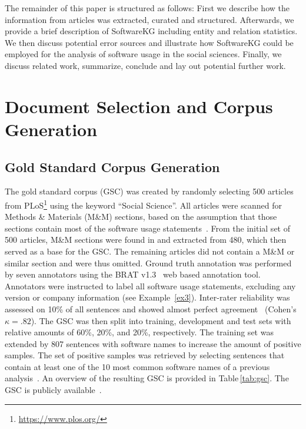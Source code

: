 \documentclass[runningheads]{llncs}
\newcommand{\tabref}[1]{Table\,\ref{#1}}
\begin{document}
The remainder of this paper is structured as follows: 
First we describe how the information from articles was extracted, curated and structured. 
Afterwards, we provide a brief description of SoftwareKG including entity and relation statistics. 
We then discuss potential error sources and illustrate how SoftwareKG could be employed for the analysis of software usage in the social sciences.
Finally, we discuss related work, summarize, conclude and lay out potential further work.  

\section{Document Selection and Corpus Generation}

\subsection{Gold Standard Corpus Generation}\label{sec:gsc}
The gold standard corpus (GSC) was created by randomly selecting 500 articles from PLoS\footnote{\url{https://www.plos.org/}} using the keyword ``Social Science''.
All articles were scanned for Methods \& Materials (M\&M) sections, based on the assumption that those sections contain most of the software usage statements~\cite{duck2013bionerds}.
From the initial set of 500 articles, M\&M sections were found in and extracted from 480, which then served as a base for the GSC.
The remaining articles did not contain a M\&M or similar section and were thus omitted.
Ground truth annotation was performed by seven annotators using the BRAT v1.3~\cite{stenetorp2012brat} web based annotation tool.
Annotators were instructed to label all software usage statements, excluding any version or company information (see Example~\ref{ex3}).
Inter-rater reliability was assessed on 10\% of all sentences and showed almost perfect agreement~\cite{landis1977measurement} (Cohen's $\kappa{=}.82$).
The GSC was then split into training, development and test sets with relative amounts of 60\%, 20\%, and 20\%, respectively.
The training set was extended by 807 sentences with software names to increase the amount of positive samples.
The set of positive samples was retrieved by selecting sentences that contain at least one of the 10 most common software names of a previous analysis~\cite{duck2013bionerds}.
An overview of the resulting GSC is provided in \tabref{tab:gsc}. 
The GSC is publicly available~\cite{Schindler_softwarekg_2020}.
\end{document}
